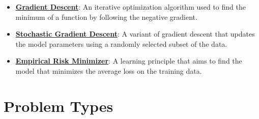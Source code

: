 \documentclass{article}%
\begin{document}
\begin{itemize}[leftmargin=*]
\item \href{\url{https://purdue.brightspace.com/d2l/common/assets/pdfjs-d2l-dist/1.0.14-legacy/web/viewer.html?file=\%252Fcontent\%252Fenforced\%252F1095467-wl.202510.CS.24300.001\%252F05L2-ML\%20Basics.pdf\%253Fou\%253D1095467\&lang=en-us\&container=d2l-fileviewer-rendered-pdf\&fullscreen=d2l-fileviewer-rendered-pdf-dialog\&height=667}#page=28}{\textbf{Gradient Descent}}: An iterative optimization algorithm used to find the minimum of a function by following the negative gradient.%
\item \href{\url{https://purdue.brightspace.com/d2l/common/assets/pdfjs-d2l-dist/1.0.14-legacy/web/viewer.html?file=\%252Fcontent\%252Fenforced\%252F1095467-wl.202510.CS.24300.001\%252F05L2-ML\%20Basics.pdf\%253Fou\%253D1095467\&lang=en-us\&container=d2l-fileviewer-rendered-pdf\&fullscreen=d2l-fileviewer-rendered-pdf-dialog\&height=667}#page=29}{\textbf{Stochastic Gradient Descent}}: A variant of gradient descent that updates the model parameters using a randomly selected subset of the data.%
\item \href{\url{https://purdue.brightspace.com/d2l/common/assets/pdfjs-d2l-dist/1.0.14-legacy/web/viewer.html?file=\%252Fcontent\%252Fenforced\%252F1095467-wl.202510.CS.24300.001\%252F05L2-ML\%20Basics.pdf\%253Fou\%253D1095467\&lang=en-us\&container=d2l-fileviewer-rendered-pdf\&fullscreen=d2l-fileviewer-rendered-pdf-dialog\&height=667}#page=15}{\textbf{Empirical Risk Minimizer}}: A learning principle that aims to find the model that minimizes the average loss on the training data.%
\end{itemize}

%
\section{Problem Types}%
\label{sec:ProblemTypes}%
\end{document}
